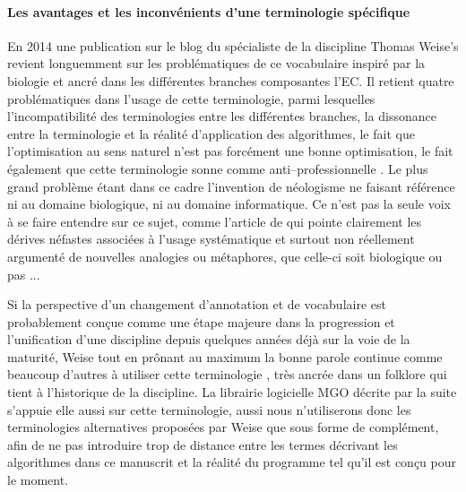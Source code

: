 \paragraph{Les avantages et les inconvénients d'une terminologie spécifique}

En 2014 une publication sur le blog du spécialiste de la discipline Thomas Weise's  revient longuemment sur les problématiques de ce vocabulaire inspiré par la biologie et ancré dans les différentes branches composantes l'EC. Il retient quatre problématiques dans l'usage de cette terminologie, parmi lesquelles l'incompatibilité des terminologies entre les différentes branches, la dissonance entre la terminologie et la réalité d'application des algorithmes, le fait que l'optimisation au sens naturel n'est pas forcément une bonne optimisation, le fait également que cette terminologie sonne comme anti--professionnelle . Le plus grand problème étant dans ce cadre l'invention de néologisme ne faisant référence ni au domaine biologique, ni au domaine informatique. Ce n'est pas la seule voix à se faire entendre sur ce sujet, comme l'article de \textcite{Sorensen2013b} qui pointe clairement les dérives néfastes associées à l'usage systématique et surtout non réellement argumenté de nouvelles analogies ou métaphores, que celle-ci soit biologique ou pas ...

Si la perspective d'un changement d'annotation et de vocabulaire est probablement conçue comme une étape majeure dans la progression et l'unification d'une discipline depuis quelques années déjà sur la voie de la maturité, Weise tout en prônant au maximum la bonne parole continue comme beaucoup d'autres à utiliser cette terminologie \autocite{Weise2011}, très ancrée dans un folklore qui tient à l'historique de la discipline. La librairie logicielle MGO décrite par la suite s'appuie elle aussi sur cette terminologie, aussi nous n'utiliserons donc les terminologies alternatives proposées par Weise que sous forme de complément, afin de ne pas introduire trop de distance entre les termes décrivant les algorithmes dans ce manuscrit et la réalité du programme tel qu'il est conçu pour le moment.


